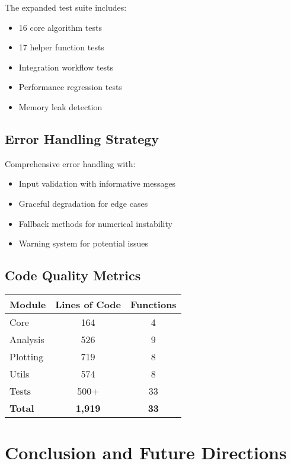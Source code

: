\documentclass[11pt,a4paper]{article}
\begin{document}
The expanded test suite includes:
\begin{itemize}
    \item 16 core algorithm tests
    \item 17 helper function tests
    \item Integration workflow tests
    \item Performance regression tests
    \item Memory leak detection
\end{itemize}

\subsection{Error Handling Strategy}

Comprehensive error handling with:
\begin{itemize}
    \item Input validation with informative messages
    \item Graceful degradation for edge cases
    \item Fallback methods for numerical instability
    \item Warning system for potential issues
\end{itemize}

\subsection{Code Quality Metrics}

\begin{center}
\begin{tabular}{|l|c|c|}
\hline
\textbf{Module} & \textbf{Lines of Code} & \textbf{Functions} \\
\hline
Core & 164 & 4 \\
Analysis & 526 & 9 \\
Plotting & 719 & 8 \\
Utils & 574 & 8 \\
Tests & 500+ & 33 \\
\hline
\textbf{Total} & \textbf{1,919} & \textbf{33} \\
\hline
\end{tabular}
\end{center}

\section{Conclusion and Future Directions}
\end{document}
